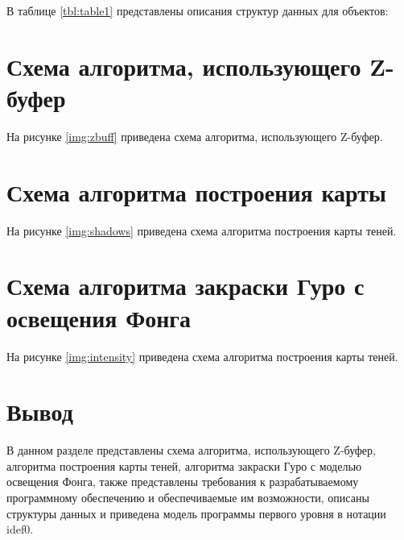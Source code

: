 В таблице \ref{tbl:table1} представлены описания структур данных для объектов:


\section{Схема алгоритма, использующего \newline Z-буфер}

На рисунке \ref{img:zbuff} приведена схема алгоритма, использующего Z-буфер.


\pagebreak

\section{Схема алгоритма построения карты }

На рисунке \ref{img:shadows} приведена схема алгоритма построения карты теней.


\pagebreak

\section{Схема алгоритма закраски Гуро с  освещения Фонга}

На рисунке \ref{img:intensity} приведена схема алгоритма построения карты теней.


\pagebreak

\section*{Вывод}

В данном разделе представлены схема алгоритма, использующего Z-буфер, алгоритма построения карты теней, алгоритма закраски Гуро с моделью освещения Фонга, также представлены требования к разрабатываемому программному обеспечению и обеспечиваемые им возможности, описаны структуры данных и приведена модель программы первого уровня в нотации idef0.
